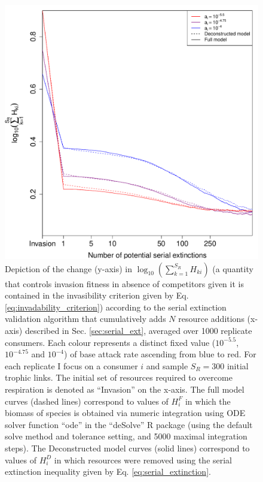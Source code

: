\documentclass[a4paper]{report}
\DeclareMathOperator{\log}{log}
\begin{document}
\begin{figure}[H]

\centering{}
\includegraphics[scale=0.5]{../Images/serial_extinction.pdf} \caption{Depiction of the change (y-axis) in $\log_{10}(\sum_{k=1}^{S_R}H_{ki})$ (a quantity that controls invasion fitness in absence of competitors given it is contained in the invasibility criterion given by Eq. \eqref{eq:invadability_criterion}) according to the serial extinction validation algorithm that cumulatively adds $N$ resource additions (x-axis) described in Sec. \ref{sec:serial_ext}, averaged over 1000 replicate consumers. Each colour represents a distinct fixed value ($10^{-5.5}$, $10^{-4.75}$ and $10^{-4}$) of base attack rate ascending from blue to red. For each replicate I focus on a consumer $i$ and sample $S_R=300$ initial trophic links. The initial set of resources required to overcome respiration is denoted as “Invasion” on the x-axis. The full model curves (dashed lines) correspond to values of $H^F_i$ in which the biomass of species is obtained via numeric integration using ODE solver function “ode” in the “deSolve” R package (using the default solve method and tolerance setting, and 5000 maximal integration steps). The Deconstructed model curves (solid lines) correspond to values of $H^D_i$ in which resources were removed using the serial extinction inequality given by Eq. \eqref{eq:serial_extinction}.\label{fig:serial_ext}}
\end{figure}
\end{document}
